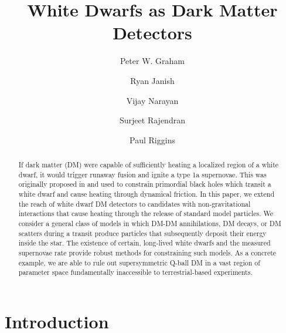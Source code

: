 \documentclass[twocolumn,preprintnumbers,amsmath,amssymb,prl, superscriptaddress]{revtex4}
\begin{document}


\title{White Dwarfs as Dark Matter Detectors}

\author{Peter W. Graham}

\author{Ryan Janish}

\author{Vijay Narayan}

\author{Surjeet Rajendran}

\author{Paul Riggins}

\begin{abstract}

If dark matter (DM) were capable of sufficiently heating a localized region of a white dwarf, it would trigger runaway fusion and ignite a type 1a supernovae. 
This was originally proposed in \cite{Graham:2015apa} and used to constrain primordial black holes which transit a white dwarf and cause heating through dynamical friction. 
In this paper, we extend the reach of white dwarf DM detectors to candidates with non-gravitational interactions that cause heating through the release of standard model particles. 
We consider a general class of models in which DM-DM annihilations, DM decays, or DM scatters during a transit produce particles that subsequently deposit their energy inside the star.  
The existence of certain, long-lived white dwarfs and the measured supernovae rate provide robust methods for constraining such models. 
As a concrete example, we are able to rule out supersymmetric Q-ball DM in a vast region of parameter space fundamentally inaccessible to terrestrial-based experiments.

\end{abstract}
\maketitle
\tableofcontents
\clearpage

\section{Introduction}
\label{sec:Introduction}
\end{document}
